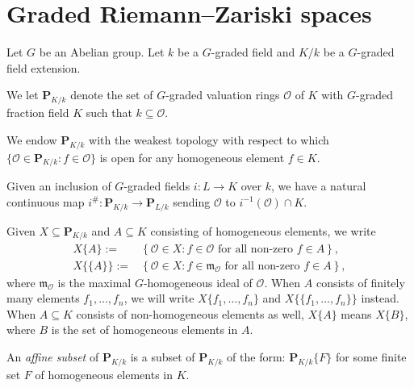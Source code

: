 \section{Graded Riemann--Zariski spaces}
Let $G$ be an Abelian group.
Let $k$ be a $G$-graded field and $K/k$ be a $G$-graded field extension.
\begin{definition}
    We let $\mathbf{P}_{K/k}$ denote the set of $G$-graded valuation rings $\mathcal{O}$ of $K$ with $G$-graded fraction field $K$ such that $k\subseteq \mathcal{O}$.


    We endow $\mathbf{P}_{K/k}$ with the weakest topology with respect to which $\{\mathcal{O}\in \mathbf{P}_{K/k}:f\in \mathcal{O}\}$ is open for any homogeneous element $f\in K$.

    Given an inclusion of $G$-graded fields $i:L\rightarrow K$ over $k$, we have a natural continuous map $i^{\#}:\mathbf{P}_{K/k}\rightarrow \mathbf{P}_{L/k}$ sending $\mathcal{O}$ to $i^{-1}(\mathcal{O})\cap K$.
\end{definition}
Given $X\subseteq \mathbf{P}_{K/k}$ and $A\subseteq K$ consisting of homogeneous elements, we write 
\[
    \begin{aligned}
        X\{A\}:=&\left\{\mathcal{O}\in X:f\in \mathcal{O} \text{ for all non-zero }f\in A \right\},\\
        X\{\{A\}\}:=&\left\{ \mathcal{O}\in X: f\in \mathfrak{m}_{\mathcal{O}} \text{ for all non-zero }f\in A \right\},
    \end{aligned}  
\]
where $\mathfrak{m}_{\mathcal{O}}$ is the maximal $G$-homogeneous ideal of $\mathcal{O}$. When $A$ consists of finitely many elements $f_1,\ldots,f_n$, we will write $X\{f_1,\ldots,f_n\}$ and $X\{\{f_1,\ldots,f_n\}\}$ instead. When $A\subseteq K$ consists of non-homogeneous elements as well, $X\{A\}$ means $X\{B\}$, where $B$ is the set of homogeneous elements in $A$.

\begin{definition}
    An \emph{affine subset} of $\mathbf{P}_{K/k}$ is a subset of $\mathbf{P}_{K/k}$ of the form: $\mathbf{P}_{K/k}\{F\}$ for some finite set $F$ of homogeneous elements in $K$.
\end{definition}

